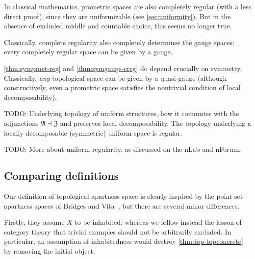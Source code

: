\documentclass{article}
\def\anti{\mathfrak{A}}
\def\neigh{\mathfrak{Z}}
\begin{document}
In classical mathematics, prometric spaces are also completely regular (with a less direct proof), since they are uniformizable (see \cref{sec:uniformity}).
But in the absence of excluded middle and countable choice, this seems no longer true.

Classically, complete regularity also completely determines the gauge spaces: every completely regular space can be given by a gauge.

\cref{thm:sympmet-reg} and \cref{thm:symgauge-creg} do depend crucially on symmetry.
Classically, \emph{any} topological space can be given by a quasi-gauge (although constructively, even a prometric space satisfies the nontrivial condition of local decomposability).

\begin{thm}
  TODO: Underlying topology of uniform structures, how it commutes with the adjunctions $\anti\dashv \neigh$ and preserves local decomposability.
  The topology underlying a locally decomposable (symmetric) uniform space is regular.
\end{thm}

TODO: More about uniform regularity, as discussed on the nLab and nForum.


\subsection{Comparing definitions}
\label{sec:top-compare}

Our definition of topological apartness space is clearly inspired by the point-set apartness spaces of Bridges and Vita~\cite[Chapter 2]{bridges-vita}, but there are several minor differences.

Firstly, they assume $X$ to be inhabited, whereas we follow instead the lesson of category theory that trivial examples should not be arbitrarily excluded.
In particular, an assumption of inhabitedness would destroy \cref{thm:top-topconcrete} by removing the initial object.
\end{document}
